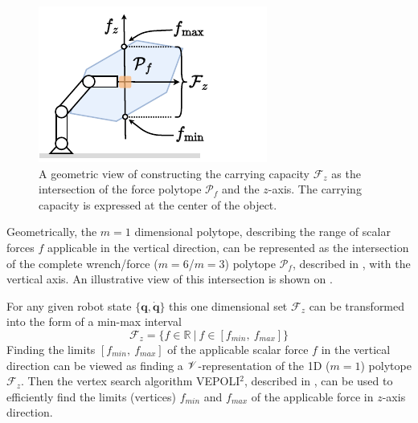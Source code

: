 \begin{figure}
\vspace{-0.5cm}
    \centering
    \includegraphics[width=\linewidth]{Papers/images/carrying_capacity_robot.pdf}
    \caption{A geometric view of constructing the carrying capacity $\mathcal{F}_z$ as the intersection of the force polytope $\mathcal{P}_f$ and the $z$-axis. The carrying capacity is expressed at the center of the object.}
    \label{fig:carrying_cap_robot}
\end{figure}

Geometrically, the $m=1$ dimensional polytope, describing the range of scalar forces $f$ applicable in the vertical direction, can be represented as the intersection of the complete wrench/force ($m=6$/$m=3$) polytope $\mathcal{P}_f$, described in , with the vertical axis. An illustrative view of this intersection is shown on .

For any given robot state $\{\bm{q},\dot{\bm{q}}\}$ this one dimensional set $\mathcal{F}_z$ can be transformed into the form of a min-max interval
\begin{equation}
    \mathcal{F}_z = \{ f \in \mathbb{R} ~|~ f \in[{f}_{min}, ~{f}_{max}]\}
\end{equation}
Finding the limits $[f_{min},~f_{max}]$ of the applicable scalar force $f$ in the vertical direction can be viewed as finding a $\mathscr{V}$-representation of the 1D ($m=1$) polytope $\mathcal{F}_z$. Then the vertex search algorithm VEPOLI$^2$, described in , can be used to efficiently find the limits (vertices) $f_{min}$ and $f_{max}$ of the applicable force in $z$-axis direction.  

